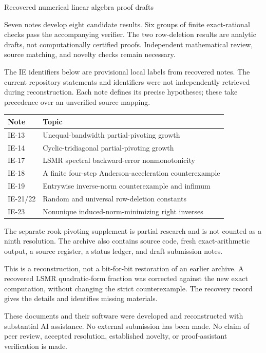 \documentclass[11pt]{article}
\begin{document}
\begin{center}
{\LARGE Recovered numerical linear algebra proof drafts}
\end{center}
\vspace{8mm}
\noindent Seven notes develop eight candidate results. Six groups of finite exact-rational checks pass the accompanying verifier. The two row-deletion results are analytic drafts, not computationally certified proofs. Independent mathematical review, source matching, and novelty checks remain necessary.

\vspace{5mm}
\noindent The IE identifiers below are provisional local labels from recovered notes. The current repository statements and identifiers were not independently retrieved during reconstruction. Each note defines its precise hypotheses; these take precedence over an unverified source mapping.

\vspace{7mm}
\noindent\begin{tabular}{@{}lp{11.7cm}@{}}
\toprule
Note & Topic\\
\midrule
IE-13 & Unequal-bandwidth partial-pivoting growth\\[4pt]
IE-14 & Cyclic-tridiagonal partial-pivoting growth\\[4pt]
IE-17 & LSMR spectral backward-error nonmonotonicity\\[4pt]
IE-18 & A finite four-step Anderson-acceleration counterexample\\[4pt]
IE-19 & Entrywise inverse-norm counterexample and infimum\\[4pt]
IE-21/22 & Random and universal row-deletion constants\\[4pt]
IE-23 & Nonunique induced-norm-minimizing right inverses\\
\bottomrule
\end{tabular}

\vspace{7mm}
\noindent The separate rook-pivoting supplement is partial research and is not counted as a ninth resolution. The archive also contains source code, fresh exact-arithmetic output, a source register, a status ledger, and draft submission notes.

\vspace{4mm}
\noindent This is a reconstruction, not a bit-for-bit restoration of an earlier archive. A recovered LSMR quadratic-form fraction was corrected against the new exact computation, without changing the strict counterexample. The recovery record gives the details and identifies missing materials.

\vspace{4mm}
\noindent These documents and their software were developed and reconstructed with substantial AI assistance. No external submission has been made. No claim of peer review, accepted resolution, established novelty, or proof-assistant verification is made.
\clearpage







\end{document}
